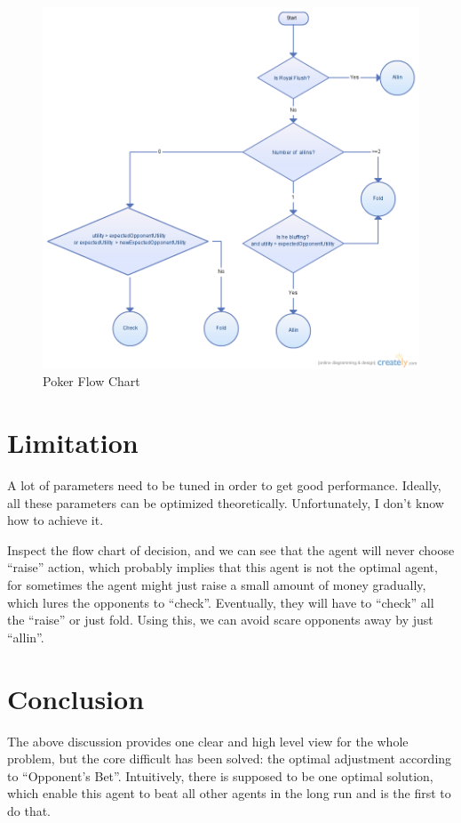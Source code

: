 \documentclass{report}
\begin{document}
\begin{figure}[t]
	\begin{center}
		\includegraphics[scale=0.4]{PokerFlowChart.png}
		\caption{Poker Flow Chart}
	\end{center}
\end{figure}

\section{Limitation}
A lot of parameters need to be tuned in order to get good performance. Ideally, all these parameters can be optimized theoretically. Unfortunately, I 
don't know how to achieve it.

Inspect the flow chart of decision, and we can see that the agent will never choose ``raise'' action, which probably implies that this agent is not 
the optimal agent, for sometimes the agent might just raise a small amount of money gradually, which lures the opponents to ``check''. Eventually, 
they will have to ``check'' all the ``raise'' or just fold. Using this, we can avoid scare opponents away by just ``allin''.

\section{Conclusion}
The above discussion provides one clear and high level view for the whole problem, but the core difficult has been solved: the optimal adjustment 
according to ``Opponent's Bet''. Intuitively, there is supposed to be one optimal solution, which enable this agent to beat all other agents in the 
long run and is the first to do that.
\end{document}
